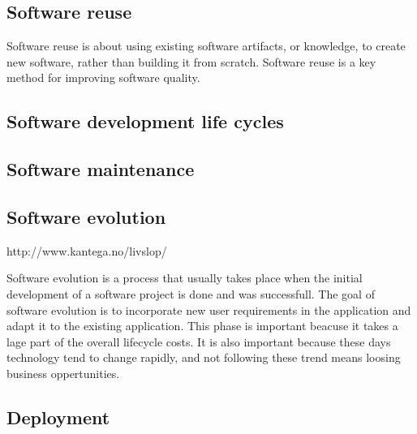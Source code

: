 \subsection{Software reuse}
Software reuse is about using existing software artifacts, or knowledge, to create new software, rather than building it from scratch. Software reuse is a key method for improving software quality. 


\subsection{Software development life cycles} %

\subsection{Software maintenance}



\subsection{Software evolution} %
http://www.kantega.no/livslop/

Software evolution is a process that usually takes place when the initial development of a software project is done and was successfull. The goal of software evolution is to incorporate new user requirements in the application and adapt it to the existing application. This phase is important beacuse it takes a lage part of the overall lifecycle costs. It is also important because these days technology tend to change rapidly, and not following these trend means loosing business oppertunities.


\subsection{Deployment} %







